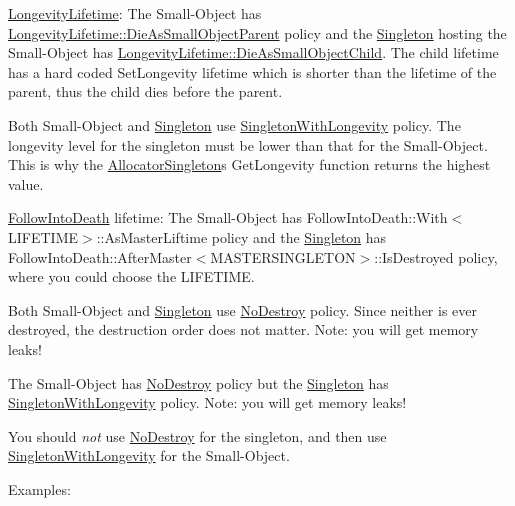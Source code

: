 \begin{DoxyItemize}
\item \hyperlink{namespaceLongevityLifetime}{Longevity\+Lifetime}\+: The Small-\/\+Object has \hyperlink{structLoki_1_1LongevityLifetime_1_1DieAsSmallObjectParent}{Longevity\+Lifetime\+::\+Die\+As\+Small\+Object\+Parent} policy and the \hyperlink{classLoki_1_1Singleton}{Singleton} hosting the Small-\/\+Object has \hyperlink{structLoki_1_1LongevityLifetime_1_1DieAsSmallObjectChild}{Longevity\+Lifetime\+::\+Die\+As\+Small\+Object\+Child}. The child lifetime has a hard coded Set\+Longevity lifetime which is shorter than the lifetime of the parent, thus the child dies before the parent.
\item Both Small-\/\+Object and \hyperlink{classLoki_1_1Singleton}{Singleton} use \hyperlink{classLoki_1_1SingletonWithLongevity}{Singleton\+With\+Longevity} policy. The longevity level for the singleton must be lower than that for the Small-\/\+Object. This is why the \hyperlink{classLoki_1_1AllocatorSingleton}{Allocator\+Singleton}\textquotesingle{}s Get\+Longevity function returns the highest value.
\item \hyperlink{classLoki_1_1FollowIntoDeath}{Follow\+Into\+Death} lifetime\+: The Small-\/\+Object has Follow\+Into\+Death\+::\+With$<$\+L\+I\+F\+E\+T\+I\+M\+E$>$\+::\+As\+Master\+Liftime policy and the \hyperlink{classLoki_1_1Singleton}{Singleton} has Follow\+Into\+Death\+::\+After\+Master$<$\+M\+A\+S\+T\+E\+R\+S\+I\+N\+G\+L\+E\+T\+O\+N$>$\+::\+Is\+Destroyed policy, where you could choose the L\+I\+F\+E\+T\+I\+M\+E.
\item Both Small-\/\+Object and \hyperlink{classLoki_1_1Singleton}{Singleton} use \hyperlink{structLoki_1_1NoDestroy}{No\+Destroy} policy. Since neither is ever destroyed, the destruction order does not matter. Note\+: you will get memory leaks!
\item The Small-\/\+Object has \hyperlink{structLoki_1_1NoDestroy}{No\+Destroy} policy but the \hyperlink{classLoki_1_1Singleton}{Singleton} has \hyperlink{classLoki_1_1SingletonWithLongevity}{Singleton\+With\+Longevity} policy. Note\+: you will get memory leaks!
\end{DoxyItemize}

You should {\itshape not} use \hyperlink{structLoki_1_1NoDestroy}{No\+Destroy} for the singleton, and then use \hyperlink{classLoki_1_1SingletonWithLongevity}{Singleton\+With\+Longevity} for the Small-\/\+Object.

\begin{DoxyParagraph}{Examples\+:}

\end{DoxyParagraph}

